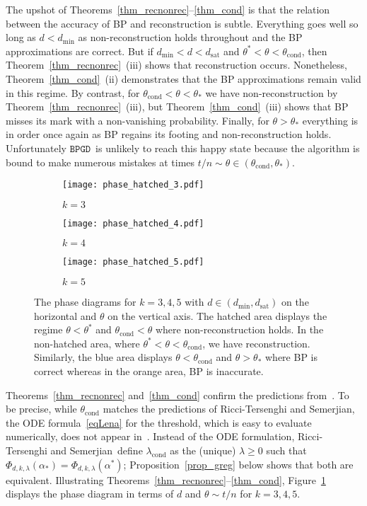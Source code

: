 \documentclass[10pt,reqno]{amsart}
\numberwithin{equation}{section}
\newcommand{\RTS}{Ricci-Tersenghi and Semerjian}
\newcommand\dmin{d_{\mathrm{min}}}
\newcommand\dsat{d_{\mathrm{sat}}}
\newcommand{\lcond}{\lambda_{\mathrm{cond}}}
\newcommand{\tcond}{\theta_{\mathrm{cond}}}
\newcommand{\BPGD}{\ensuremath{\mathtt{BPGD}}}
\newcommand\Prop{Proposition}
\newcommand\Thm{Theorem}
\newcommand\Sec{Section}
\newcommand{\Ph}{\Phi_{d,k,\lambda}}
\begin{document}
The upshot of \Thm s~\ref{thm_recnonrec}--\ref{thm_cond} is that the relation between the accuracy of BP and reconstruction is subtle.
Everything goes well so long as $d<\dmin$ as non-reconstruction holds throughout and the BP approximations are correct.
But if $\dmin<d<\dsat$ and $\theta^*<\theta<\tcond$, then \Thm~\ref{thm_recnonrec}~(iii) shows that reconstruction occurs.
Nonetheless, \Thm~\ref{thm_cond}~(ii) demonstrates that the BP approximations remain valid in this regime.
By contrast, for $\tcond<\theta<\theta_*$ we have non-reconstruction by \Thm~\ref{thm_recnonrec}~(iii), but \Thm~\ref{thm_cond}~(iii) shows that BP misses its mark with a non-vanishing probability.
Finally, for $\theta>\theta_*$ everything is in order once again as BP regains its footing and non-reconstruction holds.
Unfortunately \BPGD\ is unlikely to reach this happy state because the algorithm is bound to make numerous mistakes at times $t/n \sim \theta \in(\tcond,\theta_*)$.

\begin{figure} 
	\begin{subfigure}[b]{0.3\textwidth}
	\texttt{[image: phase\_hatched\_3.pdf]}
	\caption{$k=3$}
	\end{subfigure}
	\hspace{5mm}
	\begin{subfigure}[b]{0.3\textwidth}
	\texttt{[image: phase\_hatched\_4.pdf]}
	\caption{$k=4$}
	\end{subfigure}	
	\hspace{5mm}
	\begin{subfigure}[b]{0.3\textwidth}
	\texttt{[image: phase\_hatched\_5.pdf]}
	\caption{$k=5$}
	\end{subfigure}
	\caption{
		The phase diagrams for $k=3,4,5$ with $d\in(\dmin,\dsat)$ on the horizontal and $\theta$ on the vertical axis.
			The hatched area displays the regime $\theta<\theta^*$ and $\tcond<\theta$ where non-reconstruction holds.
			In the non-hatched area, where $\theta^*<\theta<\tcond$, we have reconstruction.
			Similarly, the blue area displays $\theta<\tcond$ and $\theta>\theta_*$ where BP is correct whereas in the orange area, BP is inaccurate. 
}\label{fig_lena}
\end{figure}

\Thm s~\ref{thm_recnonrec} and~\ref{thm_cond} confirm the predictions from~\cite[\Sec~4]{RTS}.
To be precise, while $\tcond$ matches the predictions of \RTS, the ODE formula~\eqref{eqLena} for the threshold, which is easy to evaluate numerically, does not appear in~\cite{RTS}.
Instead of the ODE formulation, \RTS\ define $\lcond$ as the (unique) $\lambda\geq0$ such that $\Ph(\alpha_*)=\Ph(\alpha^*)$; \Prop~\ref{prop_greg} below shows that both are equivalent.
Illustrating \Thm s~\ref{thm_recnonrec}--\ref{thm_cond}, Figure~\ref{fig_lena} displays the phase diagram in terms of $d$ and $\theta \sim t/n$ for $k=3,4,5$.
\end{document}

